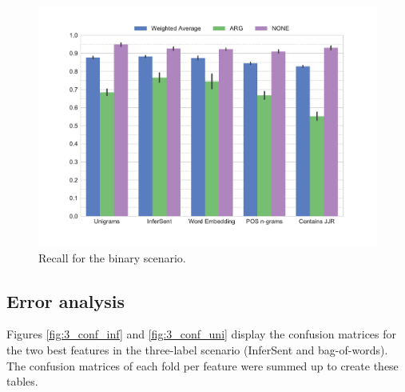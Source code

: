     \begin{figure}[tb]
     \caption{Recall for the binary scenario.} 
       \label{fig:2_recall}
 \centering
	\includegraphics[width=0.9\linewidth]{images/experiments/recall-True}

\end{figure}



\FloatBarrier
\subsection{Error analysis}
\label{sec:error_analysis}
Figures \ref{fig:3_conf_inf} and \ref{fig:3_conf_uni} display the confusion matrices for the two best features in the three-label scenario (InferSent and bag-of-words). The confusion matrices of each fold per feature were summed up to create these tables.





